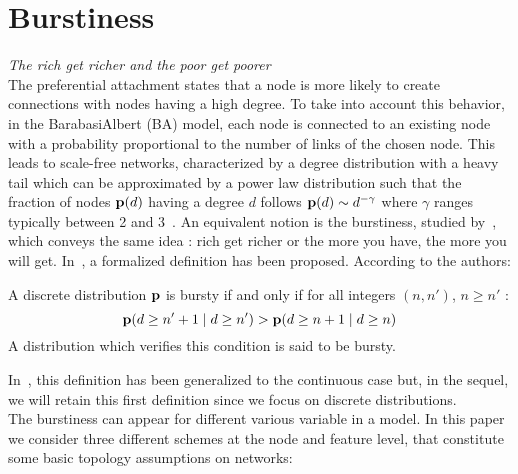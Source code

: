 \section{Burstiness}
\emph{The rich get richer and the poor get poorer} ~\\


The preferential attachment states that a node is more likely to create connections with nodes having a high degree. To take into account this behavior, in the BarabasiAlbert (BA) model, each node is connected to an existing node with a probability proportional to the number of links of the chosen node. This leads to scale-free networks, characterized by a degree distribution with a heavy tail which can be approximated by a power law distribution such that the fraction of nodes $\mathbf{p}(d)$ having a degree $d$ follows $\mathbf{p}(d) \sim d^{-\gamma}$ where $\gamma$ ranges typically between 2 and 3~\cite{barabasi1999emergence}. An equivalent notion is the burstiness, studied by~\cite{church1995poisson}, which conveys the same idea : rich get richer or the more you have, the more you will get. In~\cite{clinchant2008bnb}, a formalized definition has been proposed. According to the authors:

\begin{definition}[Burstiness]
	A discrete distribution $\mathbf{p}$ is bursty if and only if for all integers $(n, n')$, $n \geq n'$ :
	\begin{equation}
	\mathbf{p}(d \geq n'+1 \mid d \geq n') > \mathbf{p}(d \geq n+1 \mid d \geq n) 
	\end{equation}
	 A distribution which verifies this condition is said to be bursty.
\end{definition}

In~\cite{clinchant2010information}, this definition has been generalized to the continuous case but, in the sequel, we will retain this first definition since we focus on discrete distributions.~\\

The burstiness can appear for different various variable in a model. In this paper we consider three different schemes at the node and feature level, that constitute some basic topology assumptions on networks:

